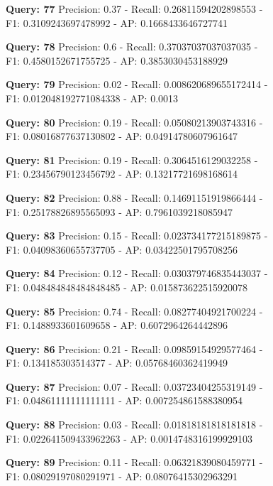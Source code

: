 \documentclass[a4paper, 11pt]{article}
\begin{document}
\textbf{Query: 77}
Precision: 0.37 - Recall: 0.26811594202898553 - \\
F1: 0.3109243697478992 - AP:  0.1668433646727741

\textbf{Query: 78}
Precision: 0.6 - Recall: 0.37037037037037035 - \\
F1: 0.4580152671755725 - AP:  0.3853030453188929

\textbf{Query: 79}
Precision: 0.02 - Recall: 0.008620689655172414 - \\
F1: 0.012048192771084338 - AP: 0.0013

\textbf{Query: 80}
Precision: 0.19 - Recall: 0.05080213903743316 - \\
F1: 0.08016877637130802 - AP:  0.04914780607961647

\textbf{Query: 81}
Precision: 0.19 - Recall: 0.3064516129032258 - \\
F1: 0.23456790123456792 - AP:  0.13217721698168614

\textbf{Query: 82}
Precision: 0.88 - Recall: 0.14691151919866444 - \\
F1: 0.25178826895565093 - AP:  0.7961039218085947

\textbf{Query: 83}
Precision: 0.15 - Recall: 0.023734177215189875 - \\
F1: 0.04098360655737705 - AP:  0.03422501795708256

\textbf{Query: 84}
Precision: 0.12 - Recall: 0.030379746835443037 - \\
F1: 0.048484848484848485 - AP:  0.015873622515920078

\textbf{Query: 85}
Precision: 0.74 - Recall: 0.08277404921700224 - \\
F1: 0.1488933601609658 - AP: 0.6072964264442896

\textbf{Query: 86}
Precision: 0.21 - Recall: 0.09859154929577464 - \\
F1: 0.134185303514377 - AP:  0.05768460362419949

\textbf{Query: 87}
Precision: 0.07 - Recall: 0.03723404255319149 - \\
F1: 0.04861111111111111 - AP:  0.007254861588380954

\textbf{Query: 88}
Precision: 0.03 - Recall: 0.01818181818181818 - \\
F1: 0.022641509433962263 - AP:  0.0014748316199929103

\textbf{Query: 89}
Precision: 0.11 - Recall: 0.06321839080459771 - \\
F1: 0.08029197080291971 - AP:  0.08076415302963291
\end{document}

